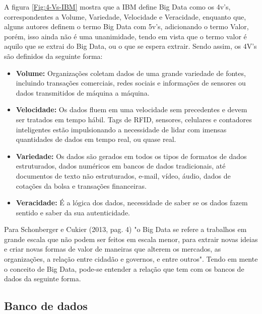 A figura \ref{Fig:4-Vs-IBM} mostra que a IBM define Big Data como os 4v's, correspondentes a Volume, Variedade, Velocidade e Veracidade, enquanto que, alguns autores definem o termo Big Data com 5v's, adicionando o termo Valor, porém, isso ainda não é uma unanimidade, tendo em vista que o termo valor é aquilo que se extrai do Big Data, ou o que se espera extrair. Sendo assim, os 4V's são definidos da seguinte forma:

\begin{itemize}

\item \textbf{Volume:} Organizações coletam dados de uma grande variedade de fontes, incluindo transações comerciais, redes sociais e informações de sensores ou dados transmitidos de máquina a máquina.\\

\item \textbf{Velocidade:} Os dados fluem em uma velocidade sem precedentes e devem ser tratados em tempo hábil. Tags de RFID, sensores, celulares e contadores inteligentes estão impulsionando a necessidade de lidar com imensas quantidades de dados em tempo real, ou quase real.\\

\item \textbf{Variedade:} Os dados são gerados em todos os tipos de formatos de dados estruturados, dados numéricos em bancos de dados tradicionais, até documentos de texto não estruturados, e-mail, vídeo, áudio, dados de cotações da bolsa e transações financeiras.\\

\item \textbf{Veracidade:} É a lógica dos dados, necessidade de saber se os dados fazem sentido e saber da sua autenticidade.\\
\end{itemize}
Para Schonberger e Cukier (2013, pag. 4) "o Big Data se refere a trabalhos em grande escala que não podem ser feitos em escala menor, para extrair novas ideias e criar novas formas de valor de maneiras que alterem os mercados, as organizações, a relação entre cidadão e governos, e entre outros". Tendo em mente o conceito de Big Data, pode-se entender a relação que tem com os bancos de dados da seguinte forma.

\subsection{Banco de dados}


